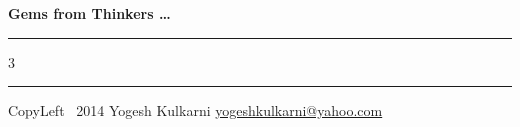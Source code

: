 \documentclass[8pt,landscape]{article}
\begin{document}
\begin{center}
     \Large{\textbf{Gems from Thinkers \ldots} 
	 }  %
\end{center}
\rule{\linewidth}{0.25pt}
\raggedright
\footnotesize
\begin{multicols}{3}

\rule{0.3\linewidth}{0.25pt}

\scriptsize
CopyLeft \textcopyleft\ 2014 Yogesh Kulkarni
\href{http://www.yogeshkulkarni.com}{yogeshkulkarni@yahoo.com}

\end{multicols}
\end{document}
